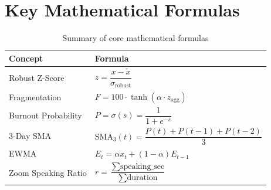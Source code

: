 \documentclass[12pt, a4paper, oneside]{report}
\begin{document}
\section{Key Mathematical Formulas}

\begin{table}[H]
\centering
\caption{Summary of core mathematical formulas}
\begin{tabular}{@{} l l @{}}
\toprule
\textbf{Concept} & \textbf{Formula} \\
\midrule
Robust Z-Score        & $z = \dfrac{x - \tilde{x}}{\hat{\sigma}_{\text{robust}}}$ \\[10pt]
Fragmentation         & $F = 100 \cdot \tanh(\alpha \cdot z_{\text{agg}})$ \\[10pt]
Burnout Probability   & $P = \sigma(s) = \dfrac{1}{1 + e^{-s}}$ \\[10pt]
3-Day SMA             & $\text{SMA}_3(t) = \dfrac{P(t) + P(t\!-\!1) + P(t\!-\!2)}{3}$ \\[10pt]
EWMA                  & $E_t = \alpha x_t + (1-\alpha) E_{t-1}$ \\[10pt]
Zoom Speaking Ratio   & $r = \dfrac{\sum \text{speaking\_sec}}{\sum \text{duration}}$ \\
\bottomrule
\end{tabular}
\end{table}

\end{document}
